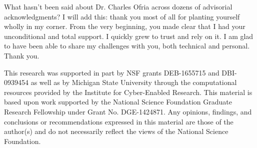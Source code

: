 What hasn't been said about Dr. Charles Ofria across dozens of advisorial acknowledgments?
I will add this: thank you most of all for planting yourself wholly in my corner.
From the very beginning, you made clear that I had your unconditional and total support.
I quickly grew to trust and rely on it.
I am glad to have been able to share my challenges with you, both technical and personal.
Thank you.

This research was supported in part by NSF grants DEB-1655715 and DBI-0939454 as well as by Michigan State University through the computational resources provided by the Institute for Cyber-Enabled Research.
This material is based upon work supported by the National Science Foundation Graduate Research Fellowship under Grant No. DGE-1424871.
Any opinions, findings, and conclusions or recommendations expressed in this material are those of the author(s) and do not necessarily reflect the views of the National Science Foundation.

